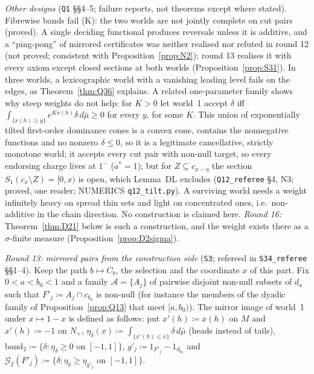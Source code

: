 \documentclass[11pt]{article}
\theoremstyle{definition}
\theoremstyle{remark}
\newcommand{\src}[1]{\texttt{#1}}
\begin{document}
\emph{Other designs} (\src{Q1} \S\S4--5; failure reports, not theorems except where stated). Fibrewise bands fail (K): the two worlds are not jointly complete on cut pairs (proved). A single deciding functional produces reversals unless it is additive, and a ``ping-pong'' of mirrored certificates was neither realised nor refuted in round 12 (not proved; consistent with Proposition~\ref{prop:N2}); round 13 realises it with every axiom except closed sections at both worlds (Proposition~\ref{prop:S31}). In three worlds, a lexicographic world with a vanishing leading level fails on the edges, as Theorem~\ref{thm:Q36} explains. A related one-parameter family shows why steep weights do not help: for $K>0$ let world~1 accept $\delta$ iff $\int_{\{x(h)\ge y\}}e^{Kx(h)}\delta\,d\bar\mu\ge0$ for every $y$, for some $K$. This union of exponentially tilted first-order dominance cones is a convex cone, contains the nonnegative functions and no nonzero $\delta\le0$, so it is a legitimate cancellative, strictly monotone world; it accepts every cut pair with non-null target, so every endorsing charge lives at $1^-$ ($a^*=1$); but for $Z\subseteq c_{x-\eta}$ the section $S_1(c_x\setminus Z)=[0,x)$ is open, which Lemma~DL excludes (\src{Q12\_referee} \S4, N3; proved, one reader; NUMERICS \src{q12\_tilt.py}). A surviving world needs a weight infinitely heavy on spread thin sets and light on concentrated ones, i.e.\ non-additive in the chain direction. No construction is claimed here. \emph{Round 16:} Theorem~\ref{thm:D21} below is such a construction, and the weight exists there as a $\sigma$-finite measure (Proposition~\ref{prop:D2sigma}).

\emph{Round 13: mirrored pairs from the construction side} (\src{S3}; refereed in \src{S34\_referee} \S\S1--4). Keep the path $b\mapsto C_b$, the selection and the coordinate $x$ of this part. Fix $0<a<b_0<1$ and a family $\mathcal A=\{A_j\}$ of pairwise disjoint non-null subsets of $d_a$ such that $F'_j\coloneqq A_j\cap c_{b_0}$ is non-null (for instance the members of the dyadic family of Proposition~\ref{prop:Q13} that meet $[a,b_0)$). The mirror image of world~1 under $x\mapsto1-x$ is defined as follows: put $x'(h)\coloneqq x(h)$ on $M$ and $x'(h)\coloneqq-1$ on $N_+$, $\eta_\delta(x)\coloneqq\int_{\{x'(h)\le x\}}\delta\,d\bar\mu$ (heads instead of tails), $\mathrm{band}_2\coloneqq\{\delta:\eta_\delta\ge0\text{ on }[-1,1]\}$, $g'_j\coloneqq1_{F'_j}-1_{d_{b_0}}$ and $\mathcal G_2(F'_j)\coloneqq\{\delta:\eta_\delta\ge\eta_{g'_j}\text{ on }[-1,1]\}$.
\end{document}

